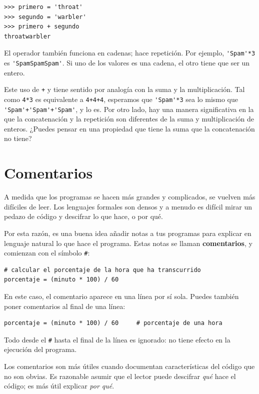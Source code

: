 \documentclass[10pt]{book}
\begin{document}
\begin{verbatim}
>>> primero = 'throat'
>>> segundo = 'warbler'
>>> primero + segundo
throatwarbler
\end{verbatim}
%
El operador {\tt *} también funciona en cadenas; hace repetición.
Por ejemplo, \verb"'Spam'*3" es \verb"'SpamSpamSpam'".  Si uno de los
valores es una cadena, el otro tiene que ser un entero.

Este uso de {\tt +} y {\tt *} tiene sentido por
analogía con la suma y la multiplicación.  Tal como {\tt 4*3} es
equivalente a {\tt 4+4+4}, esperamos que \verb"'Spam'*3" sea lo mismo que
\verb"'Spam'+'Spam'+'Spam'", y lo es.  Por otro lado, hay una
manera significativa en la que la concatenación y la repetición son
diferentes de la suma y multiplicación de enteros.
¿Puedes pensar en una propiedad que tiene la suma
que la concatenación no tiene?


\section{Comentarios}

A medida que los programas se hacen más grandes y complicados, se vuelven más difíciles
de leer.  Los lenguajes formales son densos y a menudo es difícil
mirar un pedazo de código y descifrar lo que hace, o por qué.

Por esta razón, es una buena idea añadir notas a tus programas para explicar
en lenguaje natural lo que hace el programa.  Estas notas se llaman
{\bf comentarios}, y comienzan con el símbolo \verb"#":

\begin{verbatim}
# calcular el porcentaje de la hora que ha transcurrido
porcentaje = (minuto * 100) / 60
\end{verbatim}
%
En este caso, el comentario aparece en una línea por sí sola.  Puedes también poner
comentarios al final de una línea:

\begin{verbatim}
porcentaje = (minuto * 100) / 60     # porcentaje de una hora
\end{verbatim}
%
Todo desde el {\tt \#} hasta el final de la línea es ignorado: no
tiene efecto en la ejecución del programa.

Los comentarios son más útiles cuando documentan características del
código que no son obvias.  Es razonable asumir que el lector puede descifrar
{\em qué} hace el código; es más útil explicar {\em por qué}.
\end{document}
